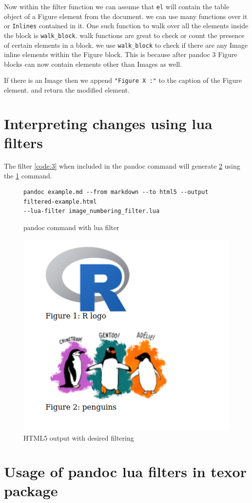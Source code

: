 Now within the filter function we can assume that \verb|el| will contain the table object of a Figure element from the document. we can use many functions over it or \verb|Inlines| contained in it. One such function to walk over all the elements inside the block is \verb|walk_block|. walk functions are great to check or count the presence of certain elements in a block. we use \verb|walk_block| to check if there are any Image inline elements within the Figure block. This is because after pandoc 3 \citep{pandoc} Figure blocks can now contain elements other than Images as well.

If there is an Image then we append \verb|"Figure X :"| to the caption of the Figure element.
and return the modified element.

\section{Interpreting changes using lua filters}

The filter \ref{code:3} when included in the pandoc command will generate \ref{fig:2} 
using the \ref{code:4} command.

\begin{figure}[htbp]
\begin{verbatim}
pandoc example.md --from markdown --to html5 --output filtered-example.html
--lua-filter image_numbering_filter.lua
\end{verbatim}
\caption{pandoc command with lua filter}
\label{code:4}
\end{figure}

\begin{figure}[htbp]
\centering
\includegraphics[width=0.5\linewidth]{figures/example-filtered.png}
\caption{HTML5 output with desired filtering}
\label{fig:2}
\end{figure}

\section{Usage of pandoc lua filters in texor package}


